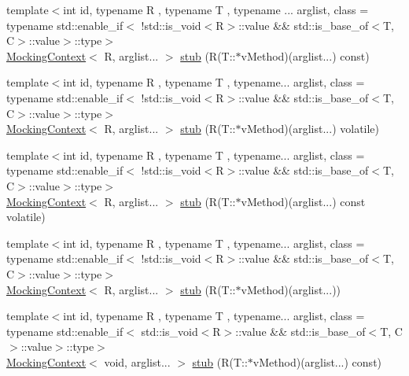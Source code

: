 \begin{DoxyCompactItemize}
\item 
{\footnotesize template$<$int id, typename R , typename T , typename ... arglist, class  = typename std\+::enable\+\_\+if$<$                !std\+::is\+\_\+void$<$\+R$>$\+::value \&\& std\+::is\+\_\+base\+\_\+of$<$\+T, C$>$\+::value$>$\+::type$>$ }\\\mbox{\hyperlink{classfakeit_1_1MockingContext}{Mocking\+Context}}$<$ R, arglist... $>$ \mbox{\hyperlink{classfakeit_1_1Mock_a7a8f38b58b068b35f263eee42d75c162}{stub}} (R(T\+::$\ast$v\+Method)(arglist...) const)
\item 
{\footnotesize template$<$int id, typename R , typename T , typename... arglist, class  = typename std\+::enable\+\_\+if$<$                !std\+::is\+\_\+void$<$\+R$>$\+::value \&\& std\+::is\+\_\+base\+\_\+of$<$\+T, C$>$\+::value$>$\+::type$>$ }\\\mbox{\hyperlink{classfakeit_1_1MockingContext}{Mocking\+Context}}$<$ R, arglist... $>$ \mbox{\hyperlink{classfakeit_1_1Mock_a6974858200b57469de78bf2a06d6fa02}{stub}} (R(T\+::$\ast$v\+Method)(arglist...) volatile)
\item 
{\footnotesize template$<$int id, typename R , typename T , typename... arglist, class  = typename std\+::enable\+\_\+if$<$                !std\+::is\+\_\+void$<$\+R$>$\+::value \&\& std\+::is\+\_\+base\+\_\+of$<$\+T, C$>$\+::value$>$\+::type$>$ }\\\mbox{\hyperlink{classfakeit_1_1MockingContext}{Mocking\+Context}}$<$ R, arglist... $>$ \mbox{\hyperlink{classfakeit_1_1Mock_a963fce628ddab338bc3ee984a137db31}{stub}} (R(T\+::$\ast$v\+Method)(arglist...) const volatile)
\item 
{\footnotesize template$<$int id, typename R , typename T , typename... arglist, class  = typename std\+::enable\+\_\+if$<$                !std\+::is\+\_\+void$<$\+R$>$\+::value \&\& std\+::is\+\_\+base\+\_\+of$<$\+T, C$>$\+::value$>$\+::type$>$ }\\\mbox{\hyperlink{classfakeit_1_1MockingContext}{Mocking\+Context}}$<$ R, arglist... $>$ \mbox{\hyperlink{classfakeit_1_1Mock_a69141994a924c71af3bf9cb4d5a998b6}{stub}} (R(T\+::$\ast$v\+Method)(arglist...))
\item 
{\footnotesize template$<$int id, typename R , typename T , typename... arglist, class  = typename std\+::enable\+\_\+if$<$                std\+::is\+\_\+void$<$\+R$>$\+::value \&\& std\+::is\+\_\+base\+\_\+of$<$\+T, C$>$\+::value$>$\+::type$>$ }\\\mbox{\hyperlink{classfakeit_1_1MockingContext}{Mocking\+Context}}$<$ void, arglist... $>$ \mbox{\hyperlink{classfakeit_1_1Mock_a1861b19f93de559fc183139f1ecdfa6b}{stub}} (R(T\+::$\ast$v\+Method)(arglist...) const)

\end{DoxyCompactItemize}
